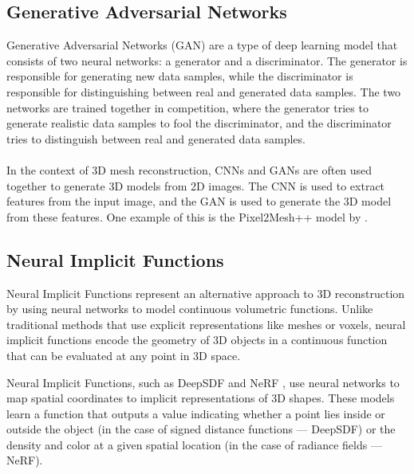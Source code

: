 \subsection{Generative Adversarial Networks} \label{section:gans}
Generative Adversarial Networks (GAN) \autocite{goodfellow_generative_2014} are a type of deep learning model that consists of two neural networks: a generator and a discriminator. The generator is responsible for generating new data samples, while the discriminator is responsible for distinguishing between real and generated data samples. The two networks are trained together in competition, where the generator tries to generate realistic data samples to fool the discriminator, and the discriminator tries to distinguish between real and generated data samples.
\paragraph{}
In the context of 3D mesh reconstruction, CNNs and GANs are often used together to generate 3D models from 2D images. The CNN is used to extract features from the input image, and the GAN is used to generate the 3D model from these features. One example of this is the Pixel2Mesh++ model by \textcite{wen_pixel2mesh_2019}.

\subsection{Neural Implicit Functions} \label{section:nif}
Neural Implicit Functions represent an alternative approach to 3D reconstruction by using neural networks to model continuous volumetric functions. Unlike traditional methods that use explicit representations like meshes or voxels, neural implicit functions encode the geometry of 3D objects in a continuous function that can be evaluated at any point in 3D space.

Neural Implicit Functions, such as DeepSDF \autocite{park_deepsdf_2019} and NeRF \autocite{mildenhall_nerf_2021}, use neural networks to map spatial coordinates to implicit representations of 3D shapes. These models learn a function that outputs a value indicating whether a point lies inside or outside the object (in the case of signed distance functions — DeepSDF) or the density and color at a given spatial location (in the case of radiance fields — NeRF).

